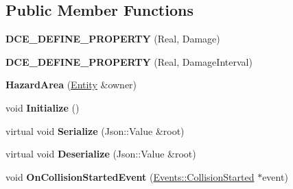 \subsection*{Public Member Functions}
\begin{DoxyCompactItemize}
\item 
\hypertarget{classDCEngine_1_1Components_1_1HazardArea_a9d524963e56ba604b2444199c0c67ae6}{{\bfseries D\-C\-E\-\_\-\-D\-E\-F\-I\-N\-E\-\_\-\-P\-R\-O\-P\-E\-R\-T\-Y} (Real, Damage)}\label{classDCEngine_1_1Components_1_1HazardArea_a9d524963e56ba604b2444199c0c67ae6}

\item 
\hypertarget{classDCEngine_1_1Components_1_1HazardArea_acde236bff525af29cd9da5206010ccdc}{{\bfseries D\-C\-E\-\_\-\-D\-E\-F\-I\-N\-E\-\_\-\-P\-R\-O\-P\-E\-R\-T\-Y} (Real, Damage\-Interval)}\label{classDCEngine_1_1Components_1_1HazardArea_acde236bff525af29cd9da5206010ccdc}

\item 
\hypertarget{classDCEngine_1_1Components_1_1HazardArea_a48dc2a397031cf648eb9684b044cc448}{{\bfseries Hazard\-Area} (\hyperlink{classDCEngine_1_1Entity}{Entity} \&owner)}\label{classDCEngine_1_1Components_1_1HazardArea_a48dc2a397031cf648eb9684b044cc448}

\item 
\hypertarget{classDCEngine_1_1Components_1_1HazardArea_a9df51889605a03452937c18e9a91a1e9}{void {\bfseries Initialize} ()}\label{classDCEngine_1_1Components_1_1HazardArea_a9df51889605a03452937c18e9a91a1e9}

\item 
\hypertarget{classDCEngine_1_1Components_1_1HazardArea_ae7b72bc0392b7990cbfaa816484c665c}{virtual void {\bfseries Serialize} (Json\-::\-Value \&root)}\label{classDCEngine_1_1Components_1_1HazardArea_ae7b72bc0392b7990cbfaa816484c665c}

\item 
\hypertarget{classDCEngine_1_1Components_1_1HazardArea_a26db2cbfc09cd0abacd4123b470e0a9c}{virtual void {\bfseries Deserialize} (Json\-::\-Value \&root)}\label{classDCEngine_1_1Components_1_1HazardArea_a26db2cbfc09cd0abacd4123b470e0a9c}

\item 
\hypertarget{classDCEngine_1_1Components_1_1HazardArea_a7a26ab7aadc20a4a109d7c88d87ecf2d}{void {\bfseries On\-Collision\-Started\-Event} (\hyperlink{classDCEngine_1_1Events_1_1CollisionStarted}{Events\-::\-Collision\-Started} $\ast$event)}\label{classDCEngine_1_1Components_1_1HazardArea_a7a26ab7aadc20a4a109d7c88d87ecf2d}


\end{DoxyCompactItemize}
